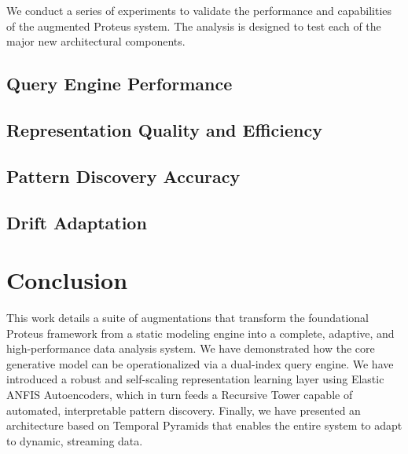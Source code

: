 \documentclass{article}
\begin{document}
We conduct a series of experiments to validate the performance and capabilities of the augmented Proteus system. The analysis is designed to test each of the major new architectural components.

\subsection{Query Engine Performance}

\subsection{Representation Quality and Efficiency}

\subsection{Pattern Discovery Accuracy}

\subsection{Drift Adaptation}

\section{Conclusion}

This work details a suite of augmentations that transform the foundational Proteus framework from a static modeling engine into a complete, adaptive, and high-performance data analysis system. We have demonstrated how the core generative model can be operationalized via a dual-index query engine. We have introduced a robust and self-scaling representation learning layer using Elastic ANFIS Autoencoders, which in turn feeds a Recursive Tower capable of automated, interpretable pattern discovery. Finally, we have presented an architecture based on Temporal Pyramids that enables the entire system to adapt to dynamic, streaming data.
\end{document}
